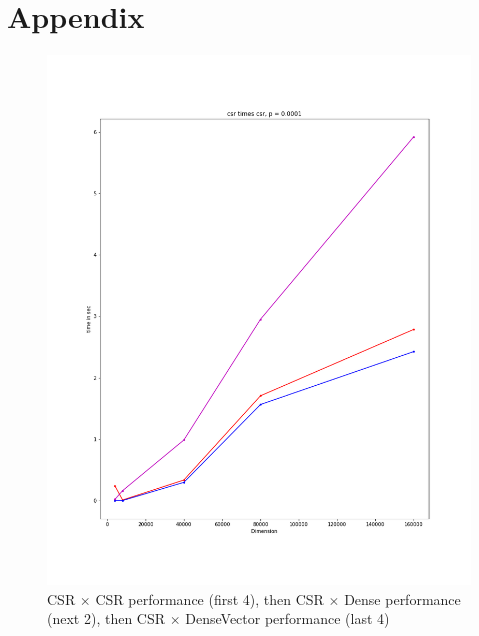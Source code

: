 \documentclass[12pt]{article}
\begin{document}
\newpage




\section{Appendix} \label{appendix}

\newpage 

\begin{figure}[h]
  \caption{CSR $\times$ CSR performance (first 4), then CSR $\times$ Dense performance (next 2), then CSR $\times$ DenseVector performance (last 4) }
  \includegraphics[scale = 0.16]{csr_csr_0001.PNG}

\end{figure}
\end{document}
